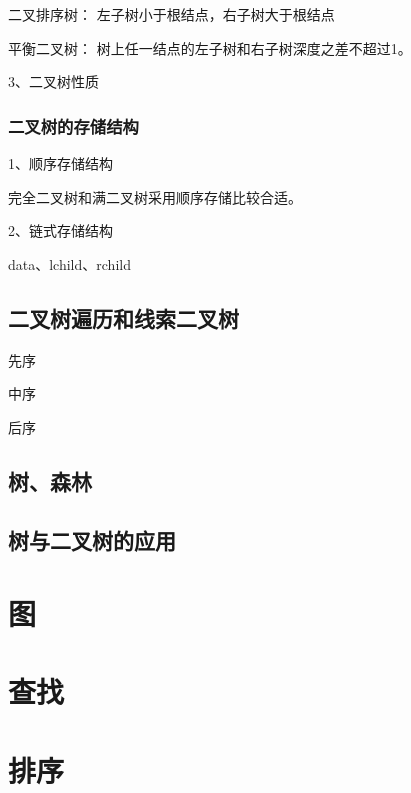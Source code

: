 \documentclass{ctexart}
\begin{document}
二叉排序树：
左子树小于根结点，右子树大于根结点

平衡二叉树：
树上任一结点的左子树和右子树深度之差不超过1。

3、二叉树性质

\subsubsection{二叉树的存储结构}

1、顺序存储结构

完全二叉树和满二叉树采用顺序存储比较合适。

2、链式存储结构

data、lchild、rchild

\subsection{二叉树遍历和线索二叉树}

先序

中序

后序

\subsection{树、森林}




\subsection{树与二叉树的应用}




\section{图}

\section{查找}

\section{排序}

\subsection{}
\end{document}
